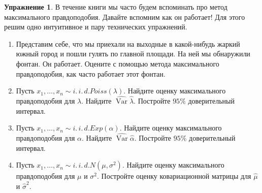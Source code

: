 \documentclass[12pt, a4paper, oneside]{extreport}
\DeclareMathOperator{\Var}{Var}
\newcommand{\iid}{\sim i.\,i.\,d.}  %
\theoremstyle{plain}              %
\theoremstyle{definition}         %
\newtheorem{problem}{\color{myblue} Упражнение}
\begin{document}
\begin{problem} 
В течение книги мы часто будем вспоминать про метод максимального правдоподобия. Давайте вспомним как он работает!  Для этого решим одно интуитивное и пару технических упражнений. 

\begin{enumerate}
	\item Представим себе, что мы приехали на выходные в какой-нибудь жаркий южный город и пошли гулять по главной площади. На ней мы обнаружили фонтан. Он работает. Оцените с помощью метода максимального правдоподобия, как часто работает этот фонтан. 
	
	\item  Пусть $x_1, \ldots, x_n   \iid  Poiss(\lambda)$. Найдите оценку максимального правдоподобия для $\lambda$.  Найдите $\hat{\Var}{\hat \lambda}$. Постройте $95\%$ доверительный интервал. 

	\item  Пусть $x_1, \ldots, x_n   \iid  Exp(\alpha)$. Найдите оценку максимального правдоподобия для $\alpha$.  Найдите $\hat{\Var}{\hat \alpha}$. Постройте $95\%$ доверительный интервал. 
	
	\item Пусть $x_1, \ldots, x_n   \iid  N(\mu, \sigma^2)$. Найдите оценку максимального правдоподобия для $\mu$ и $\sigma^2$.  Постройте оценку ковариационной матрицы для $\hat \mu$ и $\hat \sigma^2$. 

\end{enumerate}
\end{problem}
\end{document}
